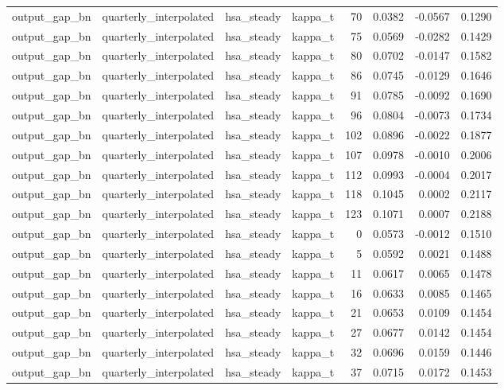 \begin{tabular}{llllrrrr}
output\_gap\_bn & quarterly\_interpolated & hsa\_steady & kappa\_t & 70 & 0.0382 & -0.0567 & 0.1290 \\
output\_gap\_bn & quarterly\_interpolated & hsa\_steady & kappa\_t & 75 & 0.0569 & -0.0282 & 0.1429 \\
output\_gap\_bn & quarterly\_interpolated & hsa\_steady & kappa\_t & 80 & 0.0702 & -0.0147 & 0.1582 \\
output\_gap\_bn & quarterly\_interpolated & hsa\_steady & kappa\_t & 86 & 0.0745 & -0.0129 & 0.1646 \\
output\_gap\_bn & quarterly\_interpolated & hsa\_steady & kappa\_t & 91 & 0.0785 & -0.0092 & 0.1690 \\
output\_gap\_bn & quarterly\_interpolated & hsa\_steady & kappa\_t & 96 & 0.0804 & -0.0073 & 0.1734 \\
output\_gap\_bn & quarterly\_interpolated & hsa\_steady & kappa\_t & 102 & 0.0896 & -0.0022 & 0.1877 \\
output\_gap\_bn & quarterly\_interpolated & hsa\_steady & kappa\_t & 107 & 0.0978 & -0.0010 & 0.2006 \\
output\_gap\_bn & quarterly\_interpolated & hsa\_steady & kappa\_t & 112 & 0.0993 & -0.0004 & 0.2017 \\
output\_gap\_bn & quarterly\_interpolated & hsa\_steady & kappa\_t & 118 & 0.1045 & 0.0002 & 0.2117 \\
output\_gap\_bn & quarterly\_interpolated & hsa\_steady & kappa\_t & 123 & 0.1071 & 0.0007 & 0.2188 \\
output\_gap\_bn & quarterly\_interpolated & hsa\_steady & kappa\_t & 0 & 0.0573 & -0.0012 & 0.1510 \\
output\_gap\_bn & quarterly\_interpolated & hsa\_steady & kappa\_t & 5 & 0.0592 & 0.0021 & 0.1488 \\
output\_gap\_bn & quarterly\_interpolated & hsa\_steady & kappa\_t & 11 & 0.0617 & 0.0065 & 0.1478 \\
output\_gap\_bn & quarterly\_interpolated & hsa\_steady & kappa\_t & 16 & 0.0633 & 0.0085 & 0.1465 \\
output\_gap\_bn & quarterly\_interpolated & hsa\_steady & kappa\_t & 21 & 0.0653 & 0.0109 & 0.1454 \\
output\_gap\_bn & quarterly\_interpolated & hsa\_steady & kappa\_t & 27 & 0.0677 & 0.0142 & 0.1454 \\
output\_gap\_bn & quarterly\_interpolated & hsa\_steady & kappa\_t & 32 & 0.0696 & 0.0159 & 0.1446 \\
output\_gap\_bn & quarterly\_interpolated & hsa\_steady & kappa\_t & 37 & 0.0715 & 0.0172 & 0.1453 \\

\end{tabular}
